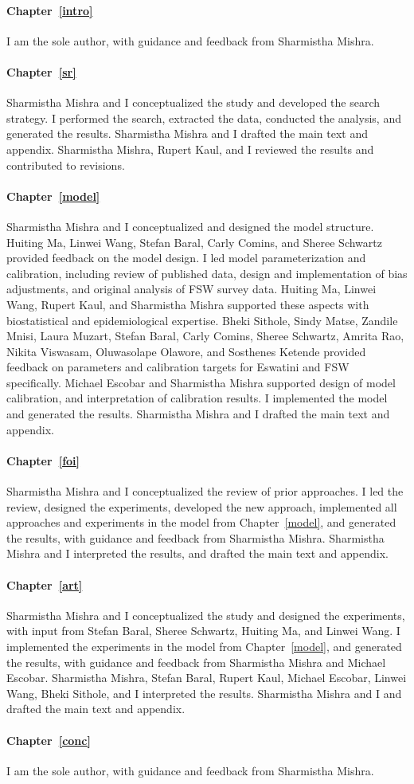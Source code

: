 \paragraph{Chapter~\ref{intro}}
I am the sole author, with guidance and feedback from Sharmistha Mishra.
\paragraph{Chapter~\ref{sr}}
Sharmistha Mishra and I conceptualized the study and developed the search strategy.
I performed the search, extracted the data, conducted the analysis, and generated the results.
Sharmistha Mishra and I drafted the main text and appendix.
Sharmistha Mishra, Rupert Kaul, and I reviewed the results and contributed to revisions.
\paragraph{Chapter~\ref{model}}
Sharmistha Mishra and I conceptualized and designed the model structure.
Huiting Ma, Linwei Wang, Stefan Baral, Carly Comins, and Sheree Schwartz provided feedback on the model design.
I led model parameterization and calibration, including
review of published data, design and implementation of bias adjustments, and original analysis of FSW survey data.
Huiting Ma, Linwei Wang, Rupert Kaul, and Sharmistha Mishra supported these aspects
with biostatistical and epidemiological expertise.
Bheki Sithole, Sindy Matse, Zandile Mnisi, Laura Muzart,
Stefan Baral, Carly Comins, Sheree Schwartz, Amrita Rao, Nikita Viswasam, Oluwasolape Olawore, and Sosthenes Ketende
provided feedback on parameters and calibration targets for Eswatini and FSW specifically.
Michael Escobar and Sharmistha Mishra supported design of model calibration, and interpretation of calibration results.
I implemented the model and generated the results.
Sharmistha Mishra and I drafted the main text and appendix.
\paragraph{Chapter~\ref{foi}}
Sharmistha Mishra and I conceptualized the review of prior approaches.
I led the review, designed the experiments, developed the new approach,
implemented all approaches and experiments in the model from Chapter~\ref{model}, and generated the results,
with guidance and feedback from Sharmistha Mishra.
Sharmistha Mishra and I interpreted the results, and drafted the main text and appendix.
\paragraph{Chapter~\ref{art}}
Sharmistha Mishra and I conceptualized the study and designed the experiments,
with input from Stefan Baral, Sheree Schwartz, Huiting Ma, and Linwei Wang.
I implemented the experiments in the model from Chapter~\ref{model}, and generated the results,
with guidance and feedback from Sharmistha Mishra and Michael Escobar.
Sharmistha Mishra, Stefan Baral, Rupert Kaul, Michael Escobar, Linwei Wang, Bheki Sithole, and I interpreted the results.
Sharmistha Mishra and I and drafted the main text and appendix.
\paragraph{Chapter~\ref{conc}}
I am the sole author, with guidance and feedback from Sharmistha Mishra.
